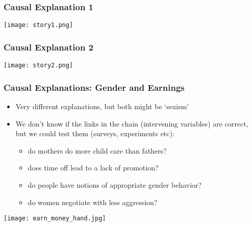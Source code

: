 \documentclass{beamer}
\begin{document}
\begin{frame}
 \frametitle{Causal Explanation 1}
 \texttt{[image: story1.png]}
\end{frame}

\begin{frame}
 \frametitle{Causal Explanation 2}
 \texttt{[image: story2.png]}
\end{frame}


\begin{frame}
 \frametitle{Causal Explanations: Gender and Earnings}
 \begin{minipage}{.58\linewidth}
 \begin{itemize}[<+->]
   \item Very different explanations, but both might be `sexism'
   \item We don't know if the links in the chain (\alert{intervening variables}) are correct, but we could test them (surveys, experiments etc):
     \begin{itemize}
		\item do mothers do more child care than fathers?
		\item does time off lead to a lack of promotion?
		\item do people have notions of appropriate gender behavior? 
		\item do women negotiate with less aggression?
     \end{itemize}
 \end{itemize}
 \end{minipage}\hfill
 \begin{minipage}{.38\linewidth}
 \texttt{[image: earn\_money\_hand.jpg]}
 \end{minipage}
\end{frame}
\end{document}
